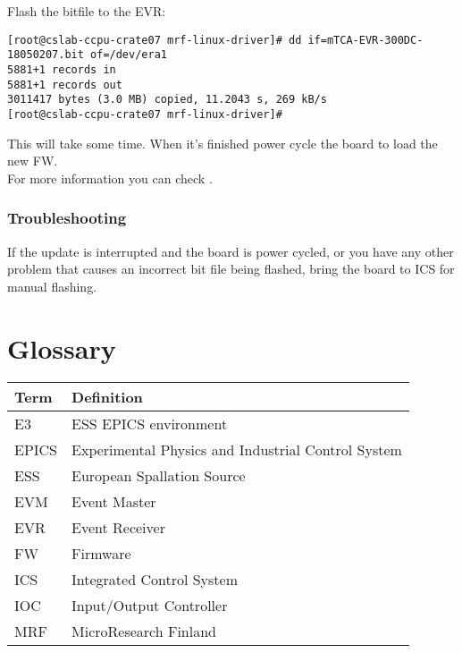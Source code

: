 \documentclass[11pt
  , a4paper
  , article
  , oneside
  , showtrims
]{memoir}
\begin{document}
Flash the bitfile to the EVR:
\begin{lstlisting}[style=termstyle]
[root@cslab-ccpu-crate07 mrf-linux-driver]# dd if=mTCA-EVR-300DC-18050207.bit of=/dev/era1
5881+1 records in
5881+1 records out
3011417 bytes (3.0 MB) copied, 11.2043 s, 269 kB/s
[root@cslab-ccpu-crate07 mrf-linux-driver]#
\end{lstlisting}

This will take some time. When it's finished power cycle the board to load the new FW.\\

For more information you can check \citep{MRFKERNELDRIVER}.\\

\subsection{Troubleshooting}
If the update is interrupted and the board is power cycled, or you have any other problem that causes an incorrect bit file being flashed, bring the board to ICS for manual flashing.\\


\clearpage



\chapter*{Glossary}\label{sec:glossary}
\begin{table}[!htb]
  \begin{tabular}{ll}
    \toprule
    \textbf{Term} & Definition                                          \\\midrule
    E3            & ESS EPICS environment                               \\
    EPICS         & Experimental Physics and Industrial Control System  \\
    ESS           & European Spallation Source                          \\
    EVM           & Event Master                                        \\
    EVR           & Event Receiver                                      \\
    FW            & Firmware                                            \\
    ICS           & Integrated Control System                           \\
    IOC           & Input/Output Controller                             \\
    MRF           & MicroResearch Finland                               \\
    \bottomrule
  \end{tabular}
  \label{table:glossary}
\end{table}
\end{document}
